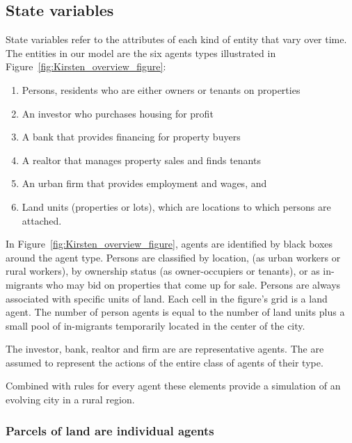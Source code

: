 \subsection{State variables}
State variables refer to the attributes of each kind of entity that vary over time. %
The entities in our model are the six agents types illustrated in Figure~\ref{fig:Kirsten_overview_figure}: 
\begin{enumerate}
    \item Persons, residents who are either owners or tenants on properties
    \item An investor who purchases housing for profit
    \item  A bank that provides financing for property buyers
    \item A realtor that manages property sales and finds tenants 
    \item An urban firm that provides employment and wages, and 
    \item Land units (properties or lots), which are locations to which persons are attached. 
\end{enumerate}

In Figure~\ref{fig:Kirsten_overview_figure}, agents are identified by black boxes around the agent type. Persons are classified by location, (as urban workers or rural workers), by ownership status (as owner-occupiers or tenants), or as in-migrants who may bid on properties that come up for sale. %
Persons are always associated with specific units of land. Each cell in the figure's grid is a land agent.  The number of person agents is equal to the number of land units plus a small pool of in-migrants temporarily located in the center of the city.

The investor, bank, realtor and firm are are \glspl{representative agent}. The are assumed to represent the actions of the entire class of agents of their type. 
 
Combined with rules for every agent these elements provide a simulation of an evolving city in a rural region. 

\subsubsection{Parcels of land are individual agents}

